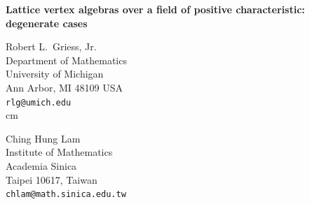 \documentclass[12pt]{article}
\def\ZZ{{\mathbb Z}}
\begin{document}
\begin{center}

{\Large \bf
Lattice vertex algebras over a field of positive characteristic: degenerate cases
}


\vspace{5mm}
Robert L.~Griess, Jr. 
\\[0pt]
Department of Mathematics\\[0pt] University of Michigan\\[0pt]
Ann Arbor, MI 48109  USA  \\[0pt]
{\tt rlg@umich.edu}\\[0pt]
 cm


Ching Hung Lam
\\[0pt]
Institute of Mathematics \\[0pt]
Academia Sinica\\[0pt]
Taipei 10617, Taiwan\\[0pt]
{\tt chlam@math.sinica.edu.tw}\\[0pt]
\vskip 0.3cm
\end{center}

\medskip


\begin{abstract}
A vertex operator algebra $V_L$ associated with a positive definite even lattice $L$ has a standard integral form, which we denote it by $V_{L,\ZZ} $.   If $F$ is a field of characteristic $p>0$, it is known that $V_{L,F}:= F\otimes_\ZZ V_{L,\ZZ}$, a vertex algebra  over $F$, is  simple  if and only if $(p, \det(L))=1$. 

In this article, we study $V_{L,F}$ when the characteristic of $F$ divides $\det(L)$. We determine the radical $\mathrm{Rad}$  of the invariant bilinear form on $V_{L,F}$, show that it is the unique maximal ideal and study the quotient vertex algebra $V_{L,F}/\mathrm{Rad}$.    
\end{abstract}

\newpage 
\tableofcontents


\medskip
\end{document}
